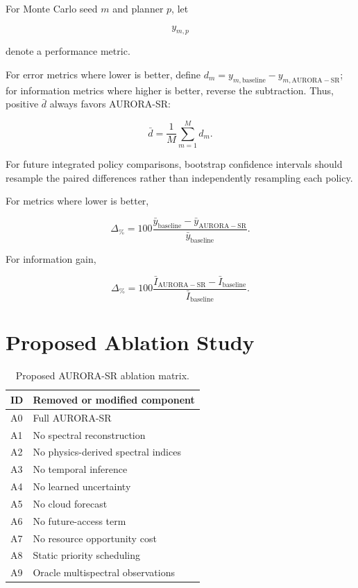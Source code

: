 \documentclass[11pt,a4paper]{article}
\begin{document}
For Monte Carlo seed $m$ and planner $p$, let

\begin{equation}
y_{m,p}
\end{equation}

denote a performance metric.

For error metrics where lower is better, define
$d_m=y_{m,\mathrm{baseline}}-y_{m,\mathrm{AURORA-SR}}$; for
information metrics where higher is better, reverse the subtraction.
Thus, positive $\bar d$ always favors AURORA-SR:

\begin{equation}
\bar d
=
\frac{1}{M}\sum_{m=1}^{M}d_m.
\end{equation}


For future integrated policy comparisons, bootstrap confidence
intervals should resample the paired differences rather than
independently resampling each policy.

For metrics where lower is better,

\begin{equation}
\Delta_{\%}
=
100
\frac{
\bar y_{\mathrm{baseline}}
-
\bar y_{\mathrm{AURORA-SR}}
}{
\bar y_{\mathrm{baseline}}
}.
\end{equation}

For information gain,

\begin{equation}
\Delta_{\%}
=
100
\frac{
\bar I_{\mathrm{AURORA-SR}}
-
\bar I_{\mathrm{baseline}}
}{
\bar I_{\mathrm{baseline}}
}.
\end{equation}


\section{Proposed Ablation Study}

\begin{table}[!htbp]
\centering
\caption{Proposed AURORA-SR ablation matrix.}
\begin{tabular}{ll}
\toprule
ID & Removed or modified component\\
\midrule
A0 & Full AURORA-SR\\
A1 & No spectral reconstruction\\
A2 & No physics-derived spectral indices\\
A3 & No temporal inference\\
A4 & No learned uncertainty\\
A5 & No cloud forecast\\
A6 & No future-access term\\
A7 & No resource opportunity cost\\
A8 & Static priority scheduling\\
A9 & Oracle multispectral observations\\
\bottomrule
\end{tabular}
\end{table}
\end{document}
